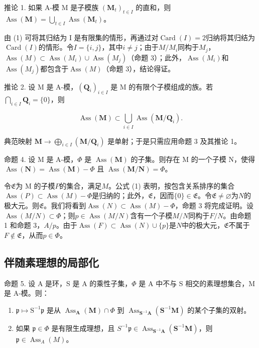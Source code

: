 推论 1. 如果 A-模 M 是子模族 \((\mathbf{M}_t)_{t \in I}\) 的直和，则 \(\operatorname{Ass}(\mathbf{M}) = \bigcup_{t \in I} \operatorname{Ass}(\mathbf{M}_t)\)。

由 (1) 可将其归结为 I 是有限集的情形，再通过对\(\operatorname{Card}(I) = 2\)归纳将其归结为\(\operatorname{Card}(I)\)的情形。令\(I = \{i, j\}\)，其中\(i \neq j\)；由于\(M/M_{i}\)同构于\(M_{j}\)，\(\operatorname{Ass}(M) \subset \operatorname{Ass}(M_{i}) \cup \operatorname{Ass}(M_{j})\)（命题 3）；此外，\(\operatorname{Ass}(M_{i})\)和\(\operatorname{Ass}(M_{j})\)都包含于\(\operatorname{Ass}(M)\)（命题 3），结论得证。

推论 2. 设 M 是 A-模，\((\mathbf{Q}_i)_{i\in I}\) 是 M 的有限个子模组成的族。若 \(\bigcap_{i\in I} \mathbf{Q}_i = \{0\}\)，则

\[
\operatorname{Ass} (\mathbf {M}) \subset \bigcup_ {i \in I} \operatorname{Ass} (\mathbf {M} / \mathbf {Q} _ {i}).
\]

典范映射 \(\mathbf{M} \to \bigoplus_{i \in I} (\mathbf{M} / \mathbf{Q}_i)\) 是单射；于是只需应用命题 3 及其推论 1。

命题 4. 设 M 是 A-模，\(\Phi\) 是 \(\operatorname{Ass}(\mathbf{M})\) 的子集。则存在 M 的一个子模 N，使得 \(\operatorname{Ass}(\mathbf{N}) = \operatorname{Ass}(\mathbf{M}) - \Phi\) 且 \(\operatorname{Ass}(\mathbf{M}/\mathbf{N}) = \Phi\)。

令\(\mathfrak{E}\)为 M 的子模\(P\)的集合，满足\(M\)。公式 (1) 表明，按包含关系排序的集合\(\operatorname{Ass}(P) \subset \operatorname{Ass}(M) - \Phi\)是归纳的；此外，\(\mathfrak{E}\)，因而\(\{0\} \in \mathfrak{E}\)。令\(\mathfrak{E} \neq \varnothing\)为\(N\)的极大元。则\(\mathfrak{E}\)。我们将看到\(\operatorname{Ass}(N) \subset \operatorname{Ass}(M) - \Phi\)，命题 3 将完成证明。设\(\operatorname{Ass}(M/N) \subset \Phi\)；则\(p \in \operatorname{Ass}(M/N)\)含有一个子模\(M/N\)同构于\(F/N\)。由命题 1 和命题 3，\(A/p\)。由于\(\operatorname{Ass}(F) \subset \operatorname{Ass}(N) \cup \{p\}\)是\(N\)中的极大元，\(\mathfrak{E}\)不属于\(F \notin \mathfrak{E}\)，从而\(p \in \Phi\)。

\subsection{伴随素理想的局部化}

命题 5. 设 A 是环，S 是 A 的乘性子集，\(\Phi\) 是 A 中不与 S 相交的素理想集合，M 是 A-模。则：

\begin{enumerate}
\def\labelenumi{(\roman{enumi})}
\item
  \(\mathfrak{p} \mapsto \mathrm{S}^{-1}\mathfrak{p}\) 是从 \(\operatorname{Ass}_{\mathbf{A}}(\mathbf{M}) \cap \Phi\) 到 \(\operatorname{Ass}_{\mathbf{S}^{-1}\mathbf{A}}(\mathbf{S}^{-1}\mathbf{M})\) 的某个子集的双射。
\item
  如果 \(\mathfrak{p} \in \Phi\) 是有限生成理想，且 \(S^{-1}\mathfrak{p} \in \operatorname{Ass}_{\mathbf{S}^{-1}\mathbf{A}}(\mathbf{S}^{-1}\mathbf{M})\)，则 \(\mathfrak{p} \in \operatorname{Ass}_A(M)\)。
\end{enumerate}

